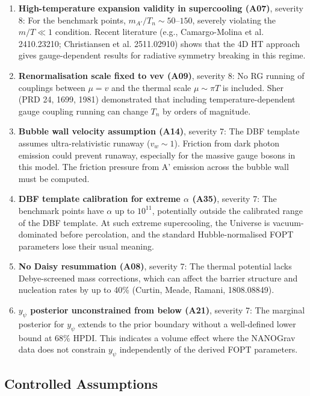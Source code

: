 \documentclass[12pt,a4paper]{article}
\begin{document}
\begin{enumerate}[resume*]
\item \textbf{High-temperature expansion validity in supercooling (A07)}, severity 8: For the benchmark points, $m_{A'}/T_n \sim 50$--$150$, severely violating the $m/T \ll 1$ condition. Recent literature (e.g., Camargo-Molina et al. 2410.23210; Christiansen et al. 2511.02910) shows that the 4D HT approach gives gauge-dependent results for radiative symmetry breaking in this regime.

\item \textbf{Renormalisation scale fixed to vev (A09)}, severity 8: No RG running of couplings between $\mu = v$ and the thermal scale $\mu \sim \pi T$ is included. Sher (PRD 24, 1699, 1981) demonstrated that including temperature-dependent gauge coupling running can change $T_n$ by orders of magnitude.

\item \textbf{Bubble wall velocity assumption (A14)}, severity 7: The DBF template assumes ultra-relativistic runaway ($v_w \sim 1$). Friction from dark photon emission could prevent runaway, especially for the massive gauge bosons in this model. The friction pressure from A' emission across the bubble wall must be computed.

\item \textbf{DBF template calibration for extreme $\alpha$ (A35)}, severity 7: The benchmark points have $\alpha$ up to $10^{11}$, potentially outside the calibrated range of the DBF template. At such extreme supercooling, the Universe is vacuum-dominated before percolation, and the standard Hubble-normalised FOPT parameters lose their usual meaning.

\item \textbf{No Daisy resummation (A08)}, severity 7: The thermal potential lacks Debye-screened mass corrections, which can affect the barrier structure and nucleation rates by up to 40\% (Curtin, Meade, Ramani, 1808.08849).

\item \textbf{$y_\psi$ posterior unconstrained from below (A21)}, severity 7: The marginal posterior for $y_\psi$ extends to the prior boundary without a well-defined lower bound at 68\% HPDI. This indicates a volume effect where the NANOGrav data does not constrain $y_\psi$ independently of the derived FOPT parameters.
\end{enumerate}

\subsection{Controlled Assumptions}
\end{document}
